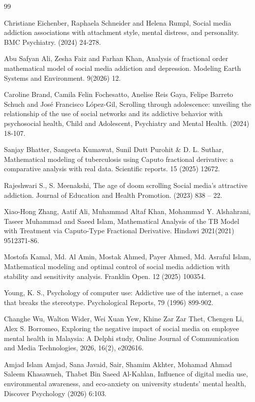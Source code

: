 \documentclass[10pt]{NSP1}
\begin{document}
	\begin{thebibliography}{99}
		
		Christiane Eichenber, Raphaela Schneider and Helena Rumpl, Social media addiction associations with attachment style, mental distress, and personality. BMC Psychiatry. (2024) 24-278.
		
		Abu Safyan Ali, Zesha Faiz and Farhan Khan, Analysis of fractional order mathematical model of social media addiction and depression. Modeling Earth Systems and Environment. 9(2026) 12.
		
		Caroline Brand, Camila Felin Fochesatto, Anelise Reis Gaya, Felipe Barreto Schuch and José Francisco López-Gil, Scrolling through adolescence: unveiling the relationship of the use of social networks and its addictive behavior with psychosocial health, Child and Adolescent, Psychiatry and Mental Health. (2024) 18-107.
		
		Sanjay Bhatter, Sangeeta Kumawat, Sunil Dutt Purohit \& D. L. Suthar, Mathematical modeling of tuberculosis using Caputo fractional derivative: a comparative analysis with real data. Scientific reports. 15 (2025) 12672.
		
		Rajeshwari S., S. Meenakshi, The age of doom scrolling Social media's attractive addiction. Journal of Education and Health Promotion. (2023) 838 – 22.
		
		Xiao-Hong Zhang, Aatif Ali, Muhammad Altaf Khan, Mohammad Y. Alshahrani, Taseer Muhammad and Saeed Islam, Mathematical Analysis of the TB Model with Treatment via Caputo-Type Fractional Derivative. Hindawi 2021(2021) 9512371-86.
		
		Mostofa Kamal, Md. Al Amin, Mostak Ahmed, Payer Ahmed, Md. Asraful Islam, Mathematical modeling and optimal control of social media addiction with stability and sensitivity analysis. Franklin Open. 12 (2025) 100354.
		
		Young, K. S., Psychology of computer use: Addictive use of the internet, a case that breaks the stereotype. Psychological Reports, 79 (1996) 899-902.
		
		Changhe Wu, Walton Wider, Wei Xuan Yew, Khine Zar Zar Thet, Chengen Li, Alex S. Borromeo, Exploring the negative impact of social media on employee mental health in Malaysia: A Delphi study, Online Journal of Communication and Media Technologies, 2026, 16(2), e202616.
		
		Amjad Islam Amjad, Sana Javaid, Sair, Shamim Akhter, Mohamad Ahmad Saleem Khasawneh, Thabet Bin Saeed Al-Kahlan, Influence of digital media use, environmental awareness, and eco-anxiety on university students' mental health, Discover Psychology (2026) 6:103.
		

\end{thebibliography}
\end{document}
